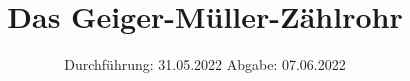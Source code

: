 

\subject{V 703}
\title{Das Geiger-Müller-Zählrohr}
\date{%
  Durchführung: 31.05.2022
  \hspace{3em}
  Abgabe: 07.06.2022
}



\maketitle
\thispagestyle{empty}
\tableofcontents
\newpage










